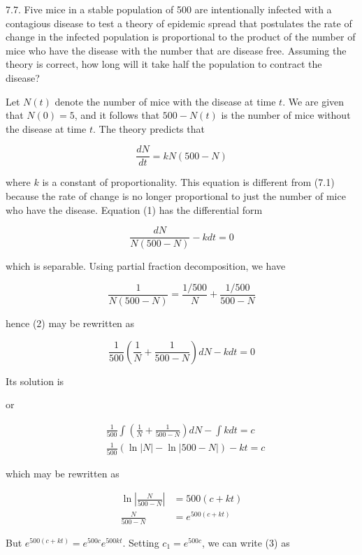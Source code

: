 \documentclass[10pt]{article}
\begin{document}
7.7. Five mice in a stable population of 500 are intentionally infected with a contagious disease to test a theory of epidemic spread that postulates the rate of change in the infected population is proportional to the product of the number of mice who have the disease with the number that are disease free. Assuming the theory is correct, how long will it take half the population to contract the disease?

Let $N(t)$ denote the number of mice with the disease at time $t$. We are given that $N(0)=5$, and it follows that $500-N(t)$ is the number of mice without the disease at time $t$. The theory predicts that


\begin{equation*}
\frac{d N}{d t}=k N(500-N) \tag{1}
\end{equation*}


where $k$ is a constant of proportionality. This equation is different from (7.1) because the rate of change is no longer proportional to just the number of mice who have the disease. Equation (1) has the differential form


\begin{equation*}
\frac{d N}{N(500-N)}-k d t=0 \tag{2}
\end{equation*}


which is separable. Using partial fraction decomposition, we have

$$
\frac{1}{N(500-N)}=\frac{1 / 500}{N}+\frac{1 / 500}{500-N}
$$

hence (2) may be rewritten as

$$
\frac{1}{500}\left(\frac{1}{N}+\frac{1}{500-N}\right) d N-k d t=0
$$

Its solution is

or

$$
\begin{aligned}
& \frac{1}{500} \int\left(\frac{1}{N}+\frac{1}{500-N}\right) d N-\int k d t=c \\
& \frac{1}{500}(\ln |N|-\ln |500-N|)-k t=c
\end{aligned}
$$

which may be rewritten as


\begin{align*}
\ln \left|\frac{N}{500-N}\right| & =500(c+k t) \\
\frac{N}{500-N} & =e^{500(c+k t)} \tag{3}
\end{align*}


But $e^{500(c+k t)}=e^{500 c} e^{500 k t}$. Setting $c_{1}=e^{500 c}$, we can write (3) as
\end{document}
